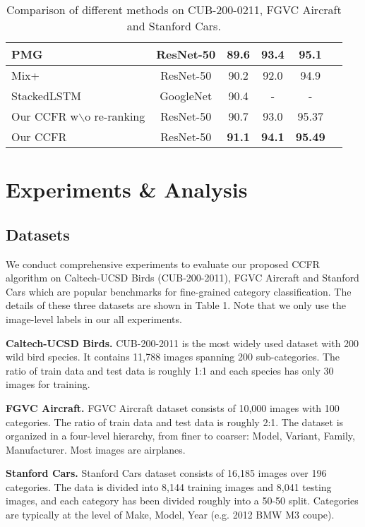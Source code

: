 \documentclass[10pt,twocolumn,letterpaper]{article}
\begin{document}
\begin{table*}
\begin{center}
\begin{tabular}{|l|c|c|c|c|c|}
\hline
PMG\cite{du2020fine} & ResNet-50  & 89.6 & 93.4 & 95.1  \\
\hline
Mix+\cite{abs-2004-02684} & ResNet-50  & 90.2 & 92.0 & 94.9 \\
\hline
StackedLSTM\cite{GeLY19}& GoogleNet &   90.4 & - & -\\
\hline
\hline
Our CCFR w$\backslash$o re-ranking & ResNet-50 & 90.7 & 93.0 & 95.37 \\
\hline
Our CCFR & ResNet-50  & \textbf{91.1} & \textbf{94.1} & \textbf{95.49} \\
\hline
\end{tabular}
\end{center}
\caption{Comparison of different methods on CUB-200-0211, FGVC Aircraft and Stanford Cars.}
\end{table*}







\section{Experiments \& Analysis}
\subsection{Datasets}
We conduct comprehensive experiments to evaluate our proposed CCFR algorithm on Caltech-UCSD Birds (CUB-200-2011\cite{wah2011caltech}), FGVC Aircraft\cite{maji2013fine} and Stanford Cars\cite{krause20133d} which are popular benchmarks for fine-grained category classification. The details of these three datasets are shown in Table 1. Note that we only use the image-level labels in our all experiments.

\noindent
\textbf{Caltech-UCSD Birds.}
CUB-200-2011 is the most widely used dataset with 200 wild bird species. It contains 11,788 images spanning 200 sub-categories. The ratio of train data and test data is roughly 1:1 and each species has only 30 images for training.

\noindent
\textbf{FGVC Aircraft.}
FGVC Aircraft dataset consists of 10,000 images with 100 categories. The ratio of train data and test data is roughly 2:1. The dataset is organized in a four-level hierarchy, from finer to coarser: Model, Variant, Family, Manufacturer. Most images are airplanes.

\noindent
\textbf{Stanford Cars.}
Stanford Cars dataset consists of 16,185 images over 196 categories. The data is divided into 8,144 training images and 8,041 testing images, and each category has been divided roughly into a 50-50 split. Categories are typically at the level of Make, Model, Year (e.g. 2012 BMW M3 coupe).
\end{document}
